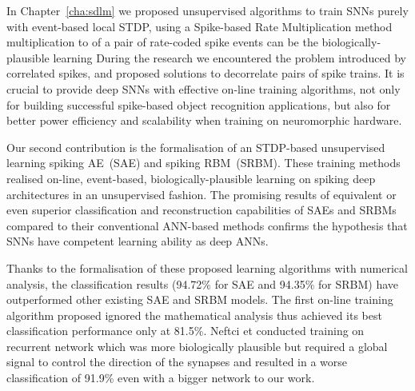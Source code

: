 In Chapter~\ref{cha:sdlm} we proposed unsupervised \protect{} \protect{} algorithms to train SNNs purely with event-based local STDP, using a Spike-based Rate Multiplication \protect{} method \protect{} \protect{} multiplication \protect{} to \protect{} \protect{} of \protect{} a pair of rate-coded spike \protect{} \protect{} events can be \protect{} \protect{} the \protect{} biologically-plausible \protect{} learning \protect{} \protect{}
During the research we encountered the problem introduced by correlated spikes, and proposed solutions to decorrelate pairs of spike trains.
It is crucial to provide deep SNNs with effective on-line training algorithms, not only for building successful spike-based object recognition applications, but also for better power efficiency and scalability when training on neuromorphic hardware.

Our second contribution is the formalisation of an STDP-based unsupervised learning \protect{} \protect{} spiking AE~(SAE) and spiking RBM~(SRBM).
These training methods \protect{} realised \protect{} on-line, event-based, biologically-plausible learning on spiking deep architectures in an unsupervised fashion.
The promising results of equivalent or even superior classification and reconstruction capabilities of SAEs and SRBMs compared to their conventional ANN-based methods confirms the hypothesis that SNNs have competent learning ability as deep ANNs.


Thanks to the formalisation of these proposed learning algorithms with numerical analysis, the classification results (94.72\% for SAE and 94.35\% for SRBM) have outperformed other existing SAE and SRBM models.
The first on-line training algorithm proposed \protect{} \protect{}\citet{neil2013online} ignored the mathematical analysis thus achieved its best classification performance only at 81.5\%.
Neftci et \protect{} \protect{}\citet{neftci2013event} conducted \protect{} training on \protect{} recurrent network which was more biologically plausible but required a global signal to control the direction of the synapses and resulted in a worse classification of 91.9\% even with a bigger network \protect{} \protect{} to our work.


